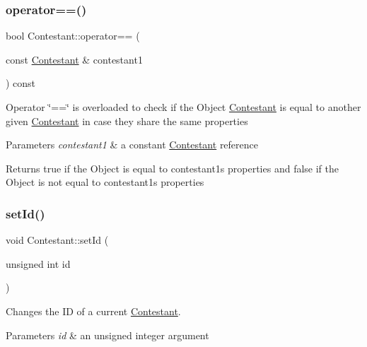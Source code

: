 \subsubsection{\texorpdfstring{operator==()}{operator==()}}
{\footnotesize\ttfamily bool Contestant\+::operator== (\begin{DoxyParamCaption}\item[{const \hyperlink{class_contestant}{Contestant} \&}]{contestant1 }\end{DoxyParamCaption}) const}

Operator \char`\"{}==\char`\"{} is overloaded to check if the Object \hyperlink{class_contestant}{Contestant} is equal to another given \hyperlink{class_contestant}{Contestant} in case they share the same properties 
\begin{DoxyParams}{Parameters}
{\em contestant1} & a constant \hyperlink{class_contestant}{Contestant} reference \\
\hline
\end{DoxyParams}
\begin{DoxyReturn}{Returns}
true if the Object is equal to contestant1\textquotesingle{}s properties and false if the Object is not equal to contestant1\textquotesingle{}s properties 
\end{DoxyReturn}
\mbox{\label{class_contestant_add8973daf90279756d9ba846dcbffa67}} 
\subsubsection{\texorpdfstring{set\+Id()}{setId()}}
{\footnotesize\ttfamily void Contestant\+::set\+Id (\begin{DoxyParamCaption}\item[{unsigned int}]{id }\end{DoxyParamCaption})}



Changes the ID of a current \hyperlink{class_contestant}{Contestant}. 


\begin{DoxyParams}{Parameters}
{\em id} & an unsigned integer argument \\
\hline
\end{DoxyParams}
\mbox{\label{class_contestant_a0ca184f1d5064ad78e7b5f643c8e4f42}} 
